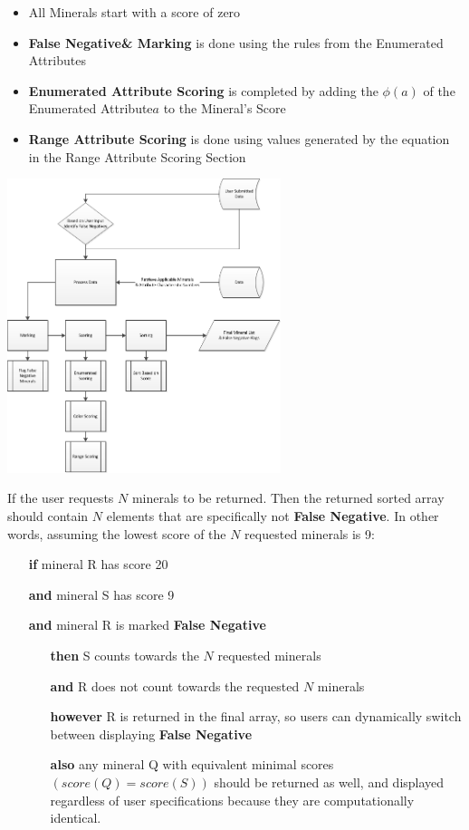 \documentclass{article}
\def \EnumA{Enumerated Attribute\xspace}
\def \RangeA{Range Attribute\xspace}
\def \FP{{\bf False Negative}\xspace}
\begin{document}
\begin{itemize}
\item All Minerals start with a score of zero
\item {\bf \FP \& Marking} is done using the rules from the \EnumA{}s
\item {\bf \EnumA Scoring} is completed by adding the $\phi(a)$ of the \EnumA $a$ to the Mineral's Score
\item {\bf \RangeA Scoring} is done using values generated by the equation in the \RangeA Scoring Section
\end{itemize}
\begin{center}
\includegraphics[width=80mm]{algFlowChart.png}
\end{center}
If the user requests $N$ minerals to be returned. Then the returned sorted array should contain $N$ elements that are specifically not \FP. In other words, assuming the lowest score of the $N$ requested minerals is 9:
\begin{itemize}
\item[{\bf if}] mineral R has score 20
\item[{\bf and}] mineral S has score 9
\item[{\bf and}] mineral R is marked \FP
\begin{itemize}
\item[{\bf then}] S counts towards the $N$ requested minerals
\item[{\bf and}] R does not count towards the requested $N$ minerals
\item[{\bf however}] R is returned in the final array, so users can dynamically switch between displaying \FP
\item[{\bf also}] any mineral Q with equivalent minimal scores $(score(Q)=score(S))$ should be returned as well, and displayed regardless of user specifications because they are computationally identical.
\end{itemize}
\end{itemize}
\end{document}
